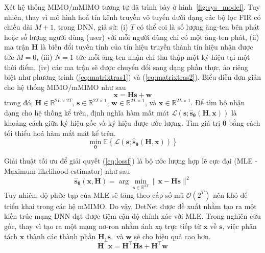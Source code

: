 Xét hệ thống MIMO/mMIMO tương tự đã trình bày ở hình~\ref{fig:sys_model}. Tuy nhiên, thay vì mô hình hoá tín kênh truyền vô tuyến dưới dạng các bộ lọc FIR có chiều dài $M+1$, trong DNN, giả sử: (i) $T$ có thể coi là số lượng ăng-ten bên phát hoặc số lượng người dùng (user) với mỗi người dùng chỉ có một ăng-ten phát, (ii) ma trận $\mathbf{H}$ là biến đổi tuyến tính của tín hiệu truyền thành tín hiệu nhận được tức $M=0$, (iii) $N=1$ tức mỗi ăng-ten nhận chỉ thu thập một ký hiệu tại một thời điểm, (iv) các ma trận sẽ được chuyển đổi sang dạng phần thực, ảo riêng biệt như phương trình (\ref{eq:matrixtras1}) và (\ref{eq:matrixtras2}). Biểu diễn đơn giản cho hệ thống MIMO/mMIMO như sau
\begin{equation}
    \mathbf{x} = \mathbf{H} \mathbf{s} + \mathbf{w}
\end{equation}
trong đó, $\mathbf{H} \in \mathbb{R}^{2L \times 2T}$, $\mathbf{s} \in \mathbb{R}^{2T \times 1}$, $\mathbf{w} \in \mathbb{R}^{2L \times 1}$, và $\mathbf{x} \in \mathbb{R}^{2L \times 1}$. Để tìm bộ nhận dạng cho hệ thống kể trên, định nghĩa hàm mất mát $\mathcal{L}\left(\mathbf{s} ; \hat{\mathbf{s}}_{\boldsymbol{\theta}}(\mathbf{H}, \mathbf{x})\right)$ là khoảng cách giữa ký hiệu gốc và ký hiệu được ước lượng. Tìm giá trị $\mathbf{\theta}$ bằng cách tối thiểu hoá hàm mất mát kể trên.
\begin{equation}
\label{eq:lossf}
\min _{\boldsymbol{\theta}} \mathbb{E}\left\{\mathcal{L}\left(\mathbf{s} ; \hat{\mathbf{s}}_{\boldsymbol{\theta}}(\mathbf{H}, \mathbf{x})\right)\right\}
\end{equation}

Giải thuật tối ưu để giải quyết (\ref{eq:lossf}) là bộ ước lượng hợp lẽ cực đại (MLE - Maximum likelihood estimator) như sau
\begin{equation}
\label{eq:mle}
\hat{\mathbf{s}}_{\boldsymbol{\theta}}(\mathbf{x}, \mathbf{H})=\arg \min _{\mathbf{s} \in \mathbb{R}^{2T}}\|\mathbf{x}-\mathbf{H} \mathbf{s}\|^2
\end{equation}
Tuy nhiên, độ phức tạp của MLE sẽ tăng theo cấp số mũ $\mathcal{O}(2^T)$ nên khó để triển khai trong các hệ mMIMO. Do vậy, DetNet được đề xuất nhằm tạo ra một kiến trúc mạng DNN đạt được tiệm cận độ chính xác với MLE. Trong nghiên cứu gốc, thay vì tạo ra một mạng nơ-ron nhằm ánh xạ trực tiếp từ $\mathbf{x}$ về $\mathbf{s}$, việc phân tách $\mathbf{x}$ thành các thành phần $\mathbf{H}, \mathbf{s},$ và $\mathbf{w}$ sẽ cho hiệu quả cao hơn.
\begin{equation}
    \mathbf{H}^\top \mathbf{x}=\mathbf{H}^\top \mathbf{H s}+\mathbf{H}^\top \mathbf{w}
\end{equation}

